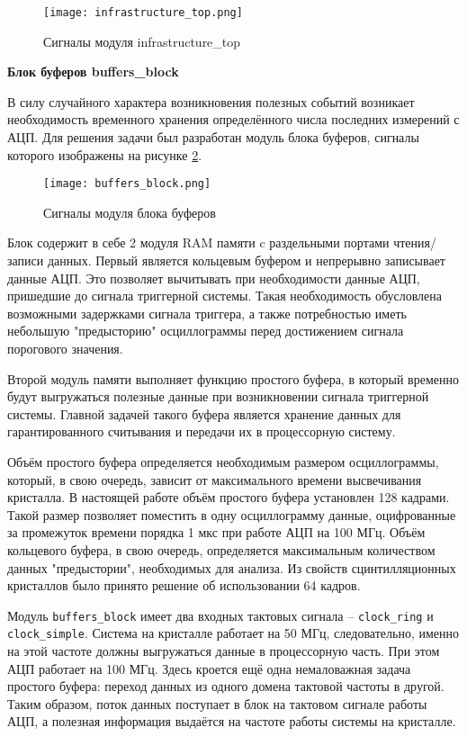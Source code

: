 \begin{figure}[ht]
    \centering
    \texttt{[image: infrastructure\_top.png]}
    \caption{Сигналы модуля infrastructure\_top}
    \label{fig:infrastructure_top}
\end{figure}
\textbf{Блок буферов buffers\_block}\par
В силу случайного характера возникновения полезных событий возникает необходимость временного хранения определённого числа последних измерений с АЦП. Для решения задачи был разработан модуль блока буферов, сигналы которого изображены на рисунке \ref{fig:buffers_block}.\par
\begin{figure}[ht]
    \centering
    \texttt{[image: buffers\_block.png]}
    \caption{Сигналы модуля блока буферов}
    \label{fig:buffers_block}
\end{figure}
Блок содержит в себе 2 модуля RAM памяти c раздельными портами чтения/записи данных. Первый является кольцевым буфером и непрерывно записывает данные АЦП. Это позволяет вычитывать при необходимости данные АЦП, пришедшие до сигнала триггерной системы. Такая необходимость обусловлена возможными задержками сигнала триггера, а также потребностью иметь небольшую "предысторию" осциллограммы перед достижением сигнала порогового значения.\par
Второй модуль памяти выполняет функцию простого буфера, в который временно будут выгружаться полезные данные при возникновении сигнала триггерной системы. Главной задачей такого буфера является хранение данных для гарантированного считывания и передачи их в процессорную систему.\par
Объём простого буфера определяется необходимым размером осциллограммы, который, в свою очередь, зависит от максимального времени высвечивания кристалла. В настоящей работе объём простого буфера установлен 128 кадрами. Такой размер позволяет поместить в одну осциллограмму данные, оцифрованные за промежуток времени порядка 1 мкс при работе АЦП на 100 МГц. Объём кольцевого буфера, в свою очередь, определяется максимальным количеством данных "предыстории", необходимых для анализа. Из свойств сцинтилляционных кристаллов было принято решение об использовании 64 кадров.\par
Модуль \texttt{buffers\_block} имеет два входных тактовых сигнала -- \texttt{clock\_ring} и \texttt{clock\_simple}. Система на кристалле работает на 50 МГц, следовательно, именно на этой частоте должны выгружаться данные в процессорную часть. При этом АЦП работает на 100 МГц. Здесь кроется ещё одна немаловажная задача простого буфера: переход данных из одного домена тактовой частоты в другой. Таким образом, поток данных поступает в блок на тактовом сигнале работы АЦП, а полезная информация выдаётся на частоте работы системы на кристалле.\par

